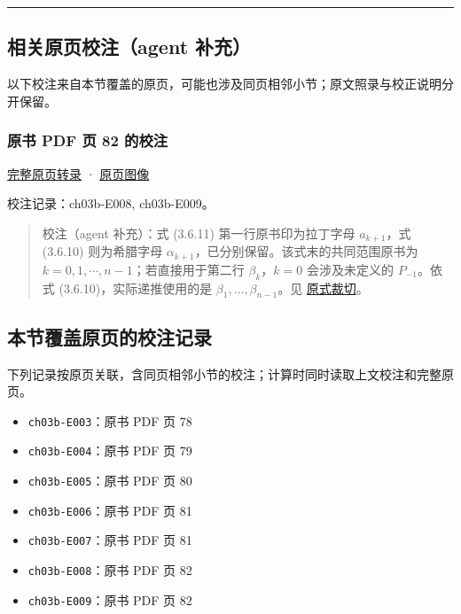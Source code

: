 \documentclass[
  10pt,
  fontset=fandol]{ctexart}
\providecommand{\tightlist}{%
  \setlength{\itemsep}{0pt}\setlength{\parskip}{0pt}}
\begin{document}
\begin{center}\rule{0.5\linewidth}{0.5pt}\end{center}

\subsection{相关原页校注（agent 补充）}\label{ux76f8ux5173ux539fux9875ux6821ux6ce8agent-ux8865ux5145}

以下校注来自本节覆盖的原页，可能也涉及同页相邻小节；原文照录与校正说明分开保留。

\subsubsection{原书 PDF 页 82 的校注}\label{ux539fux4e66-pdf-ux9875-82-ux7684ux6821ux6ce8}

\href{../pages/pdf-082.md}{完整原页转录} · \href{../../source-images/pdf-082.jpeg}{原页图像}

校注记录：ch03b-E008, ch03b-E009。

\begin{quote}
校注（agent 补充）：式 (3.6.11) 第一行原书印为拉丁字母 \(a_{k+1}\)，式 (3.6.10) 则为希腊字母 \(\alpha_{k+1}\)，已分别保留。该式末的共同范围原书为 \(k=0,1,\cdots,n-1\)；若直接用于第二行 \(\beta_k\)，\(k=0\) 会涉及未定义的 \(P_{-1}\)。依式 (3.6.10)，实际递推使用的是 \(\beta_1,\ldots,\beta_{n-1}\)。见 \href{../assets/ch03b/p082-recursion-coefficients.png}{原式裁切}。
\end{quote}

\subsection{本节覆盖原页的校注记录}\label{ux672cux8282ux8986ux76d6ux539fux9875ux7684ux6821ux6ce8ux8bb0ux5f55}

下列记录按原页关联，含同页相邻小节的校注；计算时同时读取上文校注和完整原页。

\begin{itemize}
\tightlist
\item
  \texttt{ch03b-E003}：原书 PDF 页 78
\item
  \texttt{ch03b-E004}：原书 PDF 页 79
\item
  \texttt{ch03b-E005}：原书 PDF 页 80
\item
  \texttt{ch03b-E006}：原书 PDF 页 81
\item
  \texttt{ch03b-E007}：原书 PDF 页 81
\item
  \texttt{ch03b-E008}：原书 PDF 页 82
\item
  \texttt{ch03b-E009}：原书 PDF 页 82
\end{itemize}
\end{document}
